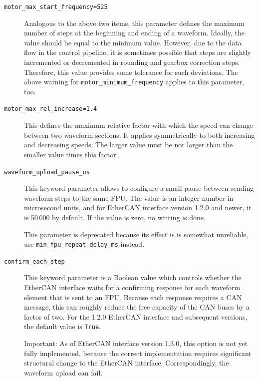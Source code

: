 \documentclass[fontsize=12,a4paper]{scrreprt}
\begin{document}
\begin{description}
\item[\texttt{motor\_max\_start\_frequency=525}] Analogous to the
  above two items, this parameter defines the maximum number of steps
  at the beginning and ending of a waveform.  Ideally, the value
  should be equal to the minimum value. However, due to the data flow
  in the control pipeline, it is sometimes possible that steps are
  slightly incremented or decremented in rounding and gearbox
  correction steps. Therefore, this value provides some tolerance for
  such deviations. The above warning for
  \texttt{motor\_minimum\_frequency} applies to this parameter, too.

\item[\texttt{motor\_max\_rel\_increase=1.4}] This defines the maximum
  relative factor with which the speed can change between two waveform
  sections. It applies symmetrically to both increasing and decreasing
  speeds: The larger value must be not larger than the smaller value
  times this factor.

\label{it:waveform_upload_pause_ms}
\item[\texttt{waveform\_upload\_pause\_us}] This keyword parameter
  allows to configure a small pause between sending waveform steps to
  the same FPU. The value is an integer number in microsecond units,
  and for EtherCAN interface version 1.2.0 and newer, it is 50\,000 by default. If
  the value is zero, no waiting is done.

  This parameter is deprecated because its effect is is somewhat
  unreliable, use \texttt{min\_fpu\_repeat\_delay\_ms} instead.

\label{it:confirm_each_step}
\item[\texttt{confirm\_each\_step}] This keyword parameter is a
  Boolean value which controls whether the EtherCAN interface waits for a
  confirming response for each waveform element that is sent to an
  FPU. Because each response requires a CAN message, this can roughly
  reduce the free capacity of the CAN buses by a factor of two. For the
  1.2.0 EtherCAN interface and subsequent versions, the default value is \texttt{True}.

  Important: As of EtherCAN interface version 1.3.0, this option is not yet fully
  implemented, because the correct implementation requires significant
  structural change to the EtherCAN interface. Correspondingly, the waveform
  upload can fail.

  \label{it:ratelimits}


\end{description}
\end{document}
